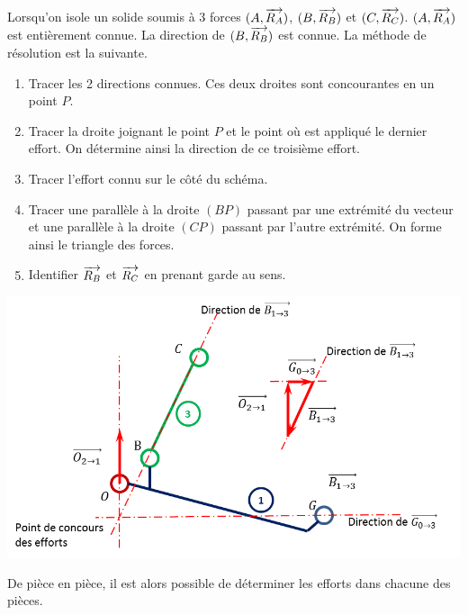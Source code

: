 \documentclass[11pt,oneside]{article}
\begin{document}
\begin{methode}
Lorsqu'on isole un solide soumis à 3 forces $(A,\overrightarrow{R_A})$, $(B,\overrightarrow{R_B})$ et $(C,\overrightarrow{R_C})$. $(A,\overrightarrow{R_A})$ est entièrement connue. La direction de $(B,\overrightarrow{R_B})$ est connue. La méthode de résolution est la suivante.
\begin{enumerate}
\item Tracer les 2 directions connues. Ces deux droites sont concourantes en un point $P$. 
\item Tracer la droite joignant le point $P$ et le point où est appliqué le dernier effort. On détermine ainsi la direction de ce troisième effort. 
\item Tracer l'effort connu sur le côté du schéma. 
\item Tracer une parallèle à la droite $(BP)$ passant par une extrémité du vecteur et une parallèle à la droite $(CP)$  passant par l'autre extrémité. On forme ainsi le triangle des forces. 
\item Identifier $\overrightarrow{R_B}$ et $\overrightarrow{R_C}$ en prenant garde au sens. 
\end{enumerate}
\end{methode}

\begin{exemple}
\begin{center}
\includegraphics[width=.75\textwidth]{png/1_F2}
\end{center}

De pièce en pièce, il est alors possible de déterminer les efforts dans chacune des pièces. 
\end{exemple}
\end{document}
